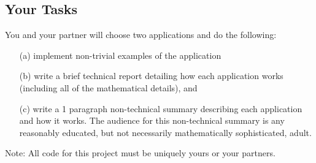 \subsection*{Your Tasks}
You and your partner will choose two applications and do the following:
\begin{enumerate}
    \item[(a)] implement non-trivial examples of the application 
    \item[(b)] write a brief technical report detailing how each application works
        (including all of the mathematical details), and
    \item[(c)] write a 1 paragraph non-technical summary describing
        each application and how it works.  The audience for this non-technical summary is
        any reasonably educated, but not necessarily mathematically sophisticated,
        adult.
\end{enumerate}

Note: All code for this project must be uniquely yours or your partners.  

